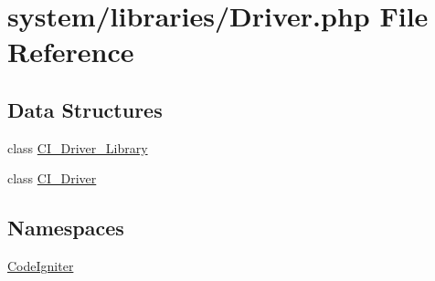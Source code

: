\hypertarget{_driver_8php}{\section{system/libraries/\-Driver.php File Reference}
\label{_driver_8php}
}
\subsection*{Data Structures}
\begin{DoxyCompactItemize}
\item 
class \hyperlink{class_c_i___driver___library}{C\-I\-\_\-\-Driver\-\_\-\-Library}
\item 
class \hyperlink{class_c_i___driver}{C\-I\-\_\-\-Driver}
\end{DoxyCompactItemize}
\subsection*{Namespaces}
\begin{DoxyCompactItemize}
\item 
\hyperlink{namespace_code_igniter}{Code\-Igniter}
\end{DoxyCompactItemize}
